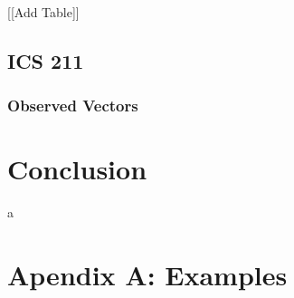 \documentclass[conference]{IEEEtran}
\newcommand{\n}{\hfill\break}
\begin{document}
[[Add Table]]
\subsection*{\textbf{ICS 211}}

\n\subsubsection*{\textbf{Observed Vectors}}\hfill\break\indent


\n\section{\textbf{Conclusion}}
a
{}
 

\section{\textbf{Apendix A: Examples}}
\end{document}

